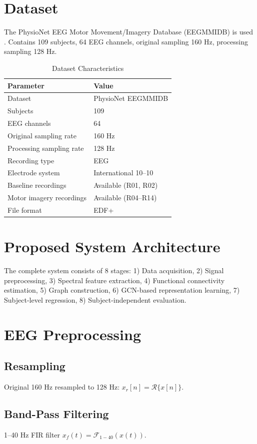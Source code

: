 \documentclass[conference]{IEEEtran}
\begin{document}
\section{Dataset}
The PhysioNet EEG Motor Movement/Imagery Database (EEGMMIDB) is used \cite{goldberger2000}. Contains 109 subjects, 64 EEG channels, original sampling 160 Hz, processing sampling 128 Hz.

\begin{table}[h]
\caption{Dataset Characteristics}
\centering
\begin{tabular}{ll}
\toprule
Parameter & Value \\
\midrule
Dataset & PhysioNet EEGMMIDB \\
Subjects & 109 \\
EEG channels & 64 \\
Original sampling rate & 160 Hz \\
Processing sampling rate & 128 Hz \\
Recording type & EEG \\
Electrode system & International 10--10 \\
Baseline recordings & Available (R01, R02) \\
Motor imagery recordings & Available (R04--R14) \\
File format & EDF+ \\
\bottomrule
\end{tabular}
\end{table}

\section{Proposed System Architecture}
The complete system consists of 8 stages: 1) Data acquisition, 2) Signal preprocessing, 3) Spectral feature extraction, 4) Functional connectivity estimation, 5) Graph construction, 6) GCN-based representation learning, 7) Subject-level regression, 8) Subject-independent evaluation.

\section{EEG Preprocessing}
\subsection{Resampling} Original 160 Hz resampled to 128 Hz: $x_r[n] = \mathcal{R}\{x[n]\}$.
\subsection{Band-Pass Filtering} 1--40 Hz FIR filter $x_f(t) = \mathcal{F}_{1-40}(x(t))$.
\end{document}
